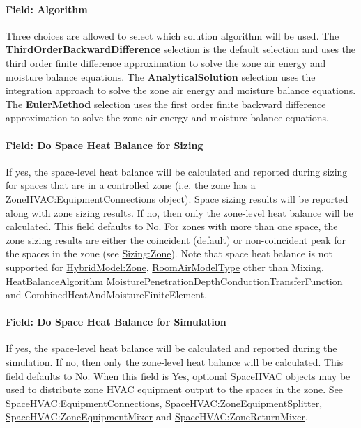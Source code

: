 \paragraph{Field: Algorithm}\label{field-algorithm-3-000}

Three choices are allowed to select which solution algorithm will be used. The \textbf{ThirdOrderBackwardDifference} selection is the default selection and uses the third order finite difference approximation to solve the zone air energy and moisture balance equations. The \textbf{AnalyticalSolution} selection uses the integration approach to solve the zone air energy and moisture balance equations. The \textbf{EulerMethod} selection uses the first order finite backward difference approximation to solve the zone air energy and moisture balance equations.

\paragraph{Field: Do Space Heat Balance for Sizing}\label{field-do-space-heat-balance-sizing}
If yes, the space-level heat balance will be calculated and reported during sizing for spaces that are in a controlled zone (i.e. the zone has a \hyperref[zonehvacequipmentconnections]{ZoneHVAC:EquipmentConnections} object). Space sizing results will be reported along with zone sizing results. If no, then only the zone-level heat balance will be calculated. This field defaults to No. For zones with more than one space, the zone sizing results are either the coincident (default) or non-coincident peak for the spaces in the zone (see \hyperref[field-type-of-space-sum-to-use]{Sizing:Zone}). Note that space heat balance is not supported for \hyperref[inputs-hm]{HybridModel:Zone}, \hyperref[roomairmodeltype]{RoomAirModelType} other than Mixing, \hyperref[heatbalancealgorithm]{HeatBalanceAlgorithm} MoisturePenetrationDepthConductionTransferFunction and CombinedHeatAndMoistureFiniteElement.

\paragraph{Field: Do Space Heat Balance for Simulation}\label{field-do-space-heat-balance-simulation}
If yes, the space-level heat balance will be calculated and reported during the simulation. If no, then only the zone-level heat balance will be calculated. This field defaults to No. When this field is Yes, optional SpaceHVAC objects may be used to distribute zone HVAC equipment output to the spaces in the zone. See \hyperref[spacehvacequipmentconnections]{SpaceHVAC:EquipmentConnections}, \hyperref[spacehvaczoneequipmentsplitter]{SpaceHVAC:ZoneEquipmentSplitter}, \hyperref[spacehvaczoneequipmentmixer]{SpaceHVAC:ZoneEquipmentMixer} and \hyperref[spacehvaczonereturnmixer]{SpaceHVAC:ZoneReturnMixer}.

